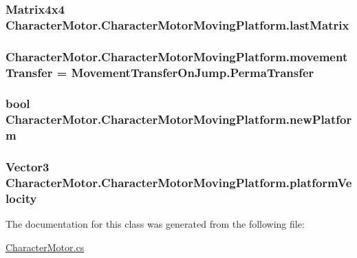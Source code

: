 \subsubsection[{last\+Matrix}]{\setlength{\rightskip}{0pt plus 5cm}Matrix4x4 Character\+Motor.\+Character\+Motor\+Moving\+Platform.\+last\+Matrix}\label{class_character_motor_1_1_character_motor_moving_platform_a68b6bf95a317e047448b9e065689b523}
\hypertarget{class_character_motor_1_1_character_motor_moving_platform_a39e0b3b19798b14d3a765c3e91fe630e}{}
\subsubsection[{movement\+Transfer}]{ Character\+Motor.\+Character\+Motor\+Moving\+Platform.\+movement\+Transfer = {\bf Movement\+Transfer\+On\+Jump.\+Perma\+Transfer}}\label{class_character_motor_1_1_character_motor_moving_platform_a39e0b3b19798b14d3a765c3e91fe630e}
\hypertarget{class_character_motor_1_1_character_motor_moving_platform_af077caf93c489e2dac9802e01d7c90b2}{}
\subsubsection[{new\+Platform}]{\setlength{\rightskip}{0pt plus 5cm}bool Character\+Motor.\+Character\+Motor\+Moving\+Platform.\+new\+Platform}\label{class_character_motor_1_1_character_motor_moving_platform_af077caf93c489e2dac9802e01d7c90b2}
\hypertarget{class_character_motor_1_1_character_motor_moving_platform_ad1c109ba8ff3d6cf1e2da071aad621d7}{}
\subsubsection[{platform\+Velocity}]{\setlength{\rightskip}{0pt plus 5cm}Vector3 Character\+Motor.\+Character\+Motor\+Moving\+Platform.\+platform\+Velocity}\label{class_character_motor_1_1_character_motor_moving_platform_ad1c109ba8ff3d6cf1e2da071aad621d7}


The documentation for this class was generated from the following file\+:\begin{DoxyCompactItemize}
\item 
\hyperlink{_character_motor_8cs}{Character\+Motor.\+cs}\end{DoxyCompactItemize}
